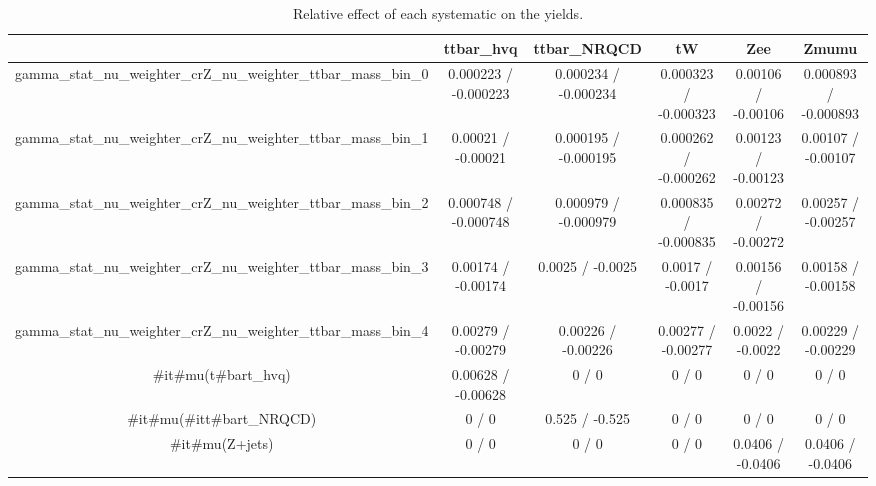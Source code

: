 \documentclass[10pt]{article}
\begin{document}
\begin{table}[htbp]
\begin{center}
\begin{tabular}{|c|c|c|c|c|c|}
\hline 
      & ttbar_hvq      & ttbar_NRQCD      & tW      & Zee      & Zmumu \\ 
\hline 
  gamma_stat_nu_weighter_crZ_nu_weighter_ttbar_mass_bin_0 & 0.000223 / -0.000223 & 0.000234 / -0.000234 & 0.000323 / -0.000323 & 0.00106 / -0.00106 & 0.000893 / -0.000893 \\ 
  gamma_stat_nu_weighter_crZ_nu_weighter_ttbar_mass_bin_1 & 0.00021 / -0.00021 & 0.000195 / -0.000195 & 0.000262 / -0.000262 & 0.00123 / -0.00123 & 0.00107 / -0.00107 \\ 
  gamma_stat_nu_weighter_crZ_nu_weighter_ttbar_mass_bin_2 & 0.000748 / -0.000748 & 0.000979 / -0.000979 & 0.000835 / -0.000835 & 0.00272 / -0.00272 & 0.00257 / -0.00257 \\ 
  gamma_stat_nu_weighter_crZ_nu_weighter_ttbar_mass_bin_3 & 0.00174 / -0.00174 & 0.0025 / -0.0025 & 0.0017 / -0.0017 & 0.00156 / -0.00156 & 0.00158 / -0.00158 \\ 
  gamma_stat_nu_weighter_crZ_nu_weighter_ttbar_mass_bin_4 & 0.00279 / -0.00279 & 0.00226 / -0.00226 & 0.00277 / -0.00277 & 0.0022 / -0.0022 & 0.00229 / -0.00229 \\ 
  #it{#mu}(t#bar{t}_{hvq}) & 0.00628 / -0.00628 & 0 / 0 & 0 / 0 & 0 / 0 & 0 / 0 \\ 
  #it{#mu}(#it{t#bar{t}}_{NRQCD}) & 0 / 0 & 0.525 / -0.525 & 0 / 0 & 0 / 0 & 0 / 0 \\ 
  #it{#mu}(Z+jets) & 0 / 0 & 0 / 0 & 0 / 0 & 0.0406 / -0.0406 & 0.0406 / -0.0406 \\ 
\hline 
\end{tabular} 
\caption{Relative effect of each systematic on the yields.} 
\end{center} 
\end{table} 
\end{document}
